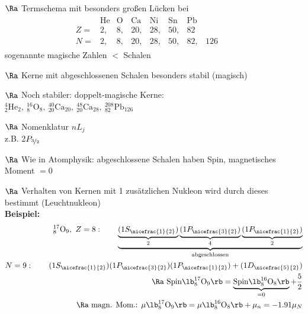 \begin{itemize}
\begin{align}
\end{align}
\item[$\Ra$] Termschema mit besonders großen Lücken bei
\begin{align*}
\boxed{
\begin{matrix}
 & \text{He} & \text{O} & \text{Ca} & \text{Ni} & \text{Sn} & \text{Pb}\\
 Z = & 2, & 8, & 20, & 28, & 50, &82\\
 N= & 2, & 8, & 20, & 28, & 50, & 82, & 126
\end{matrix}
}
\end{align*}
sogenannte \glqq magische Zahlen\grqq{} $\lt$ Schalen
\item[$\Ra$]  Kerne mit abgeschlossenen Schalen besonders stabil (\glqq magisch\grqq)
\item[$\Ra$] Noch stabiler: \glqq doppelt-magische\grqq{} Kerne:\\
$\boxed{^4_2\text{He}_2, \ ^{16}_8\text{O}_8, \ ^{40}_{20}\text{Ca}_{20}, \ ^{48}_{20}\text{Ca}_{28}, \ ^{208}_{82}\text{Pb}_{126}}$
\item[$\Ra$] Nomenklatur $nL_j$\\ z.B. 2$P_{\nicefrac{3}{2}}$
\item[$\Ra$] Wie in Atomphysik: abgeschlossene Schalen haben Spin, magnetisches Moment $=0$
\item[$\Ra$]  Verhalten von Kernen mit 1 zusätzlichen Nukleon wird durch dieses bestimmt (\glqq Leuchtnukleon\grqq)\\
\textbf{Beispiel:}
\begin{align*}
^{17}_8\text{O}_9, \ Z= 8:\qquad \underbrace{\underbrace{(1S_{\nicefrac{1}{2}})}_2 \underbrace{(1P_{\nicefrac{3}{2}})}_4 \underbrace{(1P_{\nicefrac{1}{2}})}_2}_{\text{abgeschlossen}}\\
N= 9 :\qquad (1S_{\nicefrac{1}{2}})(1P_{\nicefrac{3}{2}})(1P_{\nicefrac{1}{2}}) + (1D_{\nicefrac{5}{2}})\\
\Ra \text{ Spin} \lb  ^{17}_8\text{O}_9\rb  = \underbrace{\text{Spin}\lb  ^{16}_8\text{O}_8\rb }_{=0} + \frac{5}{2}\\
\Ra \text{ magn. Mom.: } \mu\lb  ^{17}_8\text{O}_9\rb  = \mu\lb  ^{16}_8\text{O}_8\rb  + \mu_n  = -1.91\mu_N
\end{align*}
\end{itemize}
